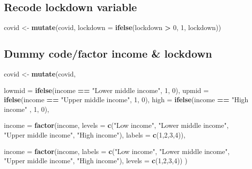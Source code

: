 \documentclass[]{article}
\newenvironment{Shaded}{\begin{snugshade}}{\end{snugshade}}
\newcommand{\KeywordTok}[1]{\textcolor[rgb]{0.13,0.29,0.53}{\textbf{#1}}}
\newcommand{\DataTypeTok}[1]{\textcolor[rgb]{0.13,0.29,0.53}{#1}}
\newcommand{\DecValTok}[1]{\textcolor[rgb]{0.00,0.00,0.81}{#1}}
\newcommand{\StringTok}[1]{\textcolor[rgb]{0.31,0.60,0.02}{#1}}
\newcommand{\OperatorTok}[1]{\textcolor[rgb]{0.81,0.36,0.00}{\textbf{#1}}}
\newcommand{\NormalTok}[1]{#1}
\begin{document}
\subsection{Recode lockdown variable}\label{recode-lockdown-variable}

\begin{Shaded}
\begin{Highlighting}[]
\NormalTok{covid <-}\StringTok{ }\KeywordTok{mutate}\NormalTok{(covid, }\DataTypeTok{lockdown =} \KeywordTok{ifelse}\NormalTok{(lockdown }\OperatorTok{>}\StringTok{ }\DecValTok{0}\NormalTok{, }\DecValTok{1}\NormalTok{, lockdown))}
\end{Highlighting}
\end{Shaded}

\subsection{Dummy code/factor income \&
lockdown}\label{dummy-codefactor-income-lockdown}

\begin{Shaded}
\begin{Highlighting}[]
\NormalTok{covid <-}\StringTok{ }\KeywordTok{mutate}\NormalTok{(covid, }
                
               \DataTypeTok{lowmid =} \KeywordTok{ifelse}\NormalTok{(income }\OperatorTok{==}\StringTok{ "Lower middle income"}\NormalTok{, }\DecValTok{1}\NormalTok{, }\DecValTok{0}\NormalTok{),}
               \DataTypeTok{upmid  =} \KeywordTok{ifelse}\NormalTok{(income }\OperatorTok{==}\StringTok{ "Upper middle income"}\NormalTok{, }\DecValTok{1}\NormalTok{, }\DecValTok{0}\NormalTok{),}
               \DataTypeTok{high   =} \KeywordTok{ifelse}\NormalTok{(income }\OperatorTok{==}\StringTok{ "High income"}\NormalTok{        , }\DecValTok{1}\NormalTok{, }\DecValTok{0}\NormalTok{),}
               
               \DataTypeTok{income =} \KeywordTok{factor}\NormalTok{(income, }
                                \DataTypeTok{levels =} \KeywordTok{c}\NormalTok{(}\StringTok{"Low income"}\NormalTok{, }\StringTok{"Lower middle income"}\NormalTok{, }\StringTok{"Upper middle income"}\NormalTok{, }\StringTok{"High income"}\NormalTok{),}
                                \DataTypeTok{labels =} \KeywordTok{c}\NormalTok{(}\DecValTok{1}\NormalTok{,}\DecValTok{2}\NormalTok{,}\DecValTok{3}\NormalTok{,}\DecValTok{4}\NormalTok{)),}
               
               \DataTypeTok{income =} \KeywordTok{factor}\NormalTok{(income, }
                                \DataTypeTok{labels =} \KeywordTok{c}\NormalTok{(}\StringTok{"Low income"}\NormalTok{, }\StringTok{"Lower middle income"}\NormalTok{, }\StringTok{"Upper middle income"}\NormalTok{, }\StringTok{"High income"}\NormalTok{),}
                                \DataTypeTok{levels =} \KeywordTok{c}\NormalTok{(}\DecValTok{1}\NormalTok{,}\DecValTok{2}\NormalTok{,}\DecValTok{3}\NormalTok{,}\DecValTok{4}\NormalTok{))        }
\NormalTok{                                )}
\end{Highlighting}
\end{Shaded}
\end{document}
